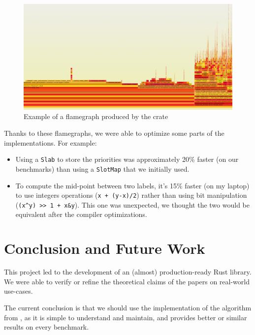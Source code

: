 \documentclass[12pt]{article}
\begin{document}
\begin{figure}[h!]
  \includegraphics[width=450px, keepaspectratio]{./flamegraph.png}
  \caption{Example of a flamegraph produced by the crate}
  \label{graph:flame}
\end{figure}

Thanks to these flamegraphs, we were able to optimize some parts of the implementations. For example:
\begin{itemize}
  \item Using a \texttt{Slab} to store the priorities was approximately 20\% faster (on our benchmarks) than using a \texttt{SlotMap} that we initially used.
  \item To compute the mid-point between two labels, it's 15\% faster (on my laptop) to use integers operations (\texttt{x + (y-x)/2}) rather than using bit manipulation (\texttt{(x\textasciicircum y) >> 1 + x\&y}). This one was unexpected, we thought the two would be equivalent after the compiler optimizations.
\end{itemize}

\newpage
\section{Conclusion and Future Work}

This project led to the development of an (almost) production-ready Rust library. We were able to verify or refine the theoretical claims of the papers on real-world use-cases.

The current conclusion is that we should use the implementation of the algorithm from \cite{10.5555/647912.740822}, as it is simple to understand and maintain, and provides better or similar results on every benchmark.
\end{document}
